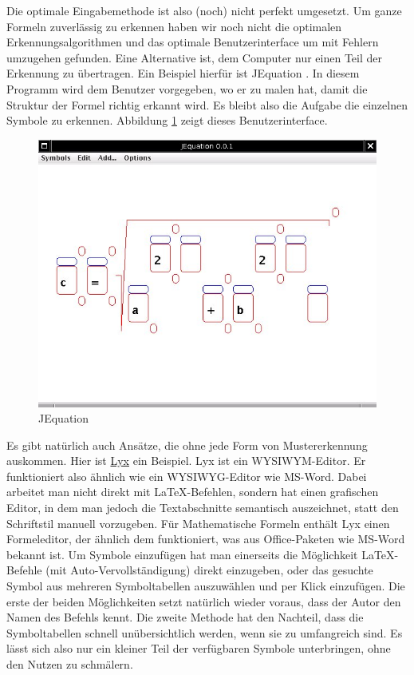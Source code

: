 Die optimale Eingabemethode ist also (noch) nicht perfekt umgesetzt. Um ganze Formeln zuverlässig zu erkennen haben wir noch nicht die optimalen Erkennungsalgorithmen und das optimale Benutzerinterface um mit Fehlern umzugehen gefunden. Eine Alternative ist, dem Computer nur einen Teil der Erkennung zu übertragen. Ein Beispiel hierfür ist JEquation \cite{jequation}. In diesem Programm wird dem Benutzer vorgegeben, wo er zu malen hat, damit die Struktur der Formel richtig erkannt wird. Es bleibt also die Aufgabe die einzelnen Symbole zu erkennen. Abbildung \ref{fig:jequation} zeigt dieses Benutzerinterface.

\begin{figure}[htbp]
  \begin{center}
    \includegraphics[width=.5\textwidth]{figures/jequation.png}
  \end{center}
  \caption{JEquation}
  \label{fig:jequation}
\end{figure}

Es gibt natürlich auch Ansätze, die ohne jede Form von Mustererkennung auskommen. Hier ist \href{http://lyx.org}{Lyx} ein Beispiel. Lyx ist ein \ac{WYSIWYM}-Editor. Er funktioniert also ähnlich wie ein \ac{WYSIWYG}-Editor wie MS-Word. Dabei arbeitet man nicht direkt mit \LaTeX-Befehlen, sondern hat einen grafischen Editor, in dem man jedoch die Textabschnitte semantisch auszeichnet, statt den Schriftstil manuell vorzugeben. Für Mathematische Formeln enthält Lyx einen Formeleditor, der ähnlich dem funktioniert, was aus Office-Paketen wie MS-Word bekannt ist. Um Symbole einzufügen hat man einerseits die Möglichkeit \LaTeX-Befehle (mit Auto-Vervollständigung) direkt einzugeben, oder das gesuchte Symbol aus mehreren Symboltabellen auszuwählen und per Klick einzufügen. Die erste der beiden Möglichkeiten setzt natürlich wieder voraus, dass der Autor den Namen des Befehls kennt. Die zweite Methode hat den Nachteil, dass die Symboltabellen schnell unübersichtlich werden, wenn sie zu umfangreich sind. Es lässt sich also nur ein kleiner Teil der verfügbaren Symbole unterbringen, ohne den Nutzen zu schmälern.

